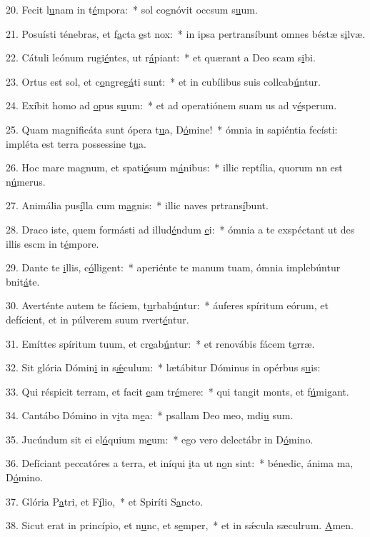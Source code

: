 20. Fecit l\uline{u}nam in t\uline{é}mpora:~* sol cognóvit occsum s\uline{u}um.\par 
21. Posuísti ténebras, et f\uline{a}cta \uline{e}st nox:~* in ipsa pertransíbunt omnes béstæ s\uline{i}lvæ.\par 
22. Cátuli leónum rugi\uline{é}ntes, ut r\uline{á}piant:~* et quærant a Deo scam s\uline{i}bi.\par 
23. Ortus est sol, et c\uline{o}ngreg\uline{á}ti sunt:~* et in cubílibus suis collcab\uline{ú}ntur.\par 
24. Exíbit homo ad \uline{o}pus s\uline{u}um:~* et ad operatiónem suam us ad v\uline{é}sperum.\par 
25. Quam magnificáta sunt ópera t\uline{u}a, D\uline{ó}mine!~* ómnia in sapiéntia fecísti: impléta est terra possessine t\uline{u}a.\par 
26. Hoc mare magnum, et spati\uline{ó}sum m\uline{á}nibus:~* illic reptília, quorum nn est n\uline{ú}merus.\par 
27. Animália pus\uline{í}lla cum m\uline{a}gnis:~* illic naves prtrans\uline{í}bunt.\par 
28. Draco iste, quem formásti ad illud\uline{é}ndum \uline{e}i:~* ómnia a te exspéctant ut des illis escm in t\uline{é}mpore.\par 
29. Dante te \uline{i}llis, c\uline{ó}lligent:~* aperiénte te manum tuam, ómnia implebúntur bnit\uline{á}te.\par 
30. Averténte autem te fáciem, t\uline{u}rbab\uline{ú}ntur:~* áuferes spíritum eórum, et defícient, et in púlverem suum rvert\uline{é}ntur.\par 
31. Emíttes spíritum tuum, et cr\uline{e}ab\uline{ú}ntur:~* et renovábis fácem t\uline{e}rræ.\par 
32. Sit glória Dómin\uline{i} in s\uline{ǽ}culum:~* lætábitur Dóminus in opérbus s\uline{u}is:\par 
33. Qui réspicit terram, et facit \uline{e}am tr\uline{é}mere:~* qui tangit monts, et f\uline{ú}migant.\par 
34. Cantábo Dómino in v\uline{i}ta m\uline{e}a:~* psallam Deo meo, mdi\uline{u} sum.\par 
35. Jucúndum sit ei el\uline{ó}quium m\uline{e}um:~* ego vero delectábr in D\uline{ó}mino.\par 
36. Defíciant peccatóres a terra, et iníqui \uline{i}ta ut n\uline{o}n sint:~* bénedic, ánima ma, D\uline{ó}mino.\par 
37. Glória P\uline{a}tri, et F\uline{í}lio,~* et Spiríti S\uline{a}ncto.\par 
38. Sicut erat in princípio, et n\uline{u}nc, et s\uline{e}mper,~* et in sǽcula sæculrum. \uline{A}men.\par 

